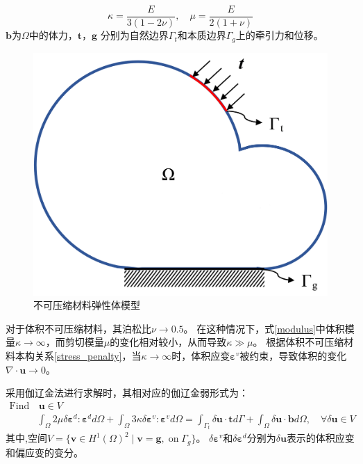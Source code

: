\begin{equation}\label{modulus}
    \kappa = \frac{E}{3(1-2\nu)}, \quad \mu = \frac{E}{2(1+\nu)}
\end{equation}
$\boldsymbol b$为$\Omega$中的体力，$\boldsymbol t$，$\boldsymbol g$ 分别为自然边界$\Gamma_t$和本质边界$\Gamma_g$上的牵引力和位移。
\begin{figure}[!h]
    \centering 
        \includegraphics[scale=0.1]{figures/model.png}
        \caption{不可压缩材料弹性体模型}\label{model}
\end{figure}

对于体积不可压缩材料，其泊松比$\nu \rightarrow 0.5$。 在这种情况下，式\eqref{modulus}中体积模量$\kappa \rightarrow \infty$，而剪切模量$\mu$的变化相对较小，从而导致$\kappa\gg\mu$。
根据体积不可压缩材料本构关系\eqref{stress_penalty}，当$\kappa \rightarrow \infty$时，体积应变$\boldsymbol \varepsilon^v$被约束，导致体积的变化$\nabla \cdot \boldsymbol u\rightarrow 0$。

采用伽辽金法进行求解时，其相对应的伽辽金弱形式为：
\begin{equation}\label{weak_penalty}
    \begin{split}
        \text{Find}&\,\boldsymbol u \in V\\
        &\int_\Omega 2\mu \delta \boldsymbol \varepsilon^d : \boldsymbol \varepsilon^d d\Omega +
        \int_\Omega 3\kappa \delta \boldsymbol \varepsilon^v : \boldsymbol \varepsilon^v d\Omega =
        \int_{\Gamma_t} \delta \boldsymbol u \cdot \boldsymbol t d\Gamma + \int_\Omega \delta \boldsymbol          u \cdot \boldsymbol b d\Omega, \quad
        \forall \delta \boldsymbol u \in V
    \end{split}
\end{equation}
其中,空间$V=\{\boldsymbol v \in H^1(\Omega)^2\;\vert\;\boldsymbol v = \boldsymbol g, \; \textrm{on} \; \Gamma_g\}$。
$\delta\boldsymbol \varepsilon^v$和$\delta\boldsymbol \varepsilon^d $分别为$\delta \boldsymbol u$表示的体积应变和偏应变的变分。

